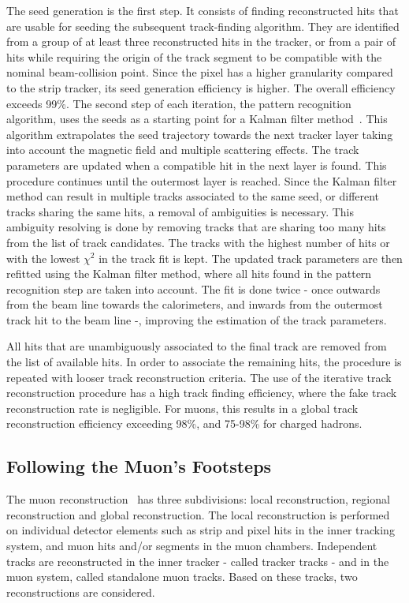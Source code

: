 The seed generation is the first step. It consists of finding reconstructed hits that are usable for seeding the subsequent track-finding algorithm. They are identified from a group of at least three reconstructed hits in the tracker, or from a pair of hits while requiring the origin of the track segment to be compatible with the nominal beam-collision point. Since the pixel has a higher granularity compared to the strip tracker, its seed generation efficiency is higher. The overall efficiency exceeds 99\%.
The second step of each iteration, the pattern recognition algorithm, uses the seeds as a starting point for a Kalman filter method~\cite{FRUHWIRTH1987444,Billoir:1989mh}. This algorithm extrapolates the seed trajectory towards the next tracker layer taking into account the magnetic field and multiple scattering effects. The track parameters are updated when a compatible hit in the next layer is found. This procedure continues until the outermost layer is reached.
Since the Kalman filter method can result in multiple tracks associated to the same seed, or different tracks sharing the same hits, a removal of ambiguities is necessary. This ambiguity resolving is done by removing tracks that are sharing too many hits from the list of track candidates. The tracks with the highest number of hits or with the lowest $\chi^2$ in the track fit is kept. 
The updated track parameters are then refitted using the Kalman filter method, where all hits found in the pattern recognition step are taken into account. The fit is done twice - once outwards from the beam line towards the calorimeters, and inwards from the outermost track hit to the beam line -, improving the estimation of the track parameters. 

All hits that are unambiguously associated to the final track are removed from the list of available hits. In order to associate the remaining hits, the procedure is repeated with looser track reconstruction criteria. The use of the iterative track reconstruction procedure has a high track finding efficiency, where the fake track reconstruction rate is negligible. 
For muons, this results in a global track reconstruction efficiency exceeding 98\%, and 75-98\% for charged hadrons. 

\subsection{Following the Muon's Footsteps}
\label{sec:MuonTrack}
The muon reconstruction~\cite{Chatrchyan:2012xi} has three subdivisions: local reconstruction, regional reconstruction and global reconstruction. The local reconstruction is performed on individual detector elements such as strip and pixel hits in the inner tracking system, and muon hits and/or segments in the muon chambers. Independent tracks are reconstructed in the inner tracker - called tracker tracks -  and in the muon system, called standalone muon tracks.
Based on these tracks, two reconstructions are considered.

